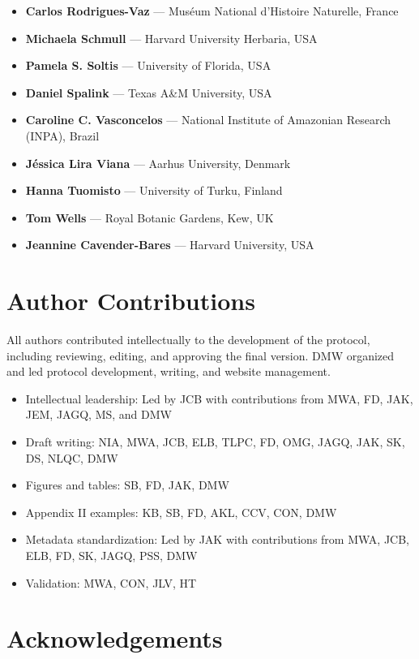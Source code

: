 \documentclass[
  letterpaper,
  DIV=11,
  numbers=noendperiod]{scrreprt}
\providecommand{\tightlist}{%
  \setlength{\itemsep}{0pt}\setlength{\parskip}{0pt}}
\begin{document}
\begin{itemize}
  \textbf{Natalia L. Quinteros} Casaverde --- NASA Goddard Space Flight
  Center, USA
\item
  \textbf{Carlos Rodrigues-Vaz} --- Muséum National d'Histoire
  Naturelle, France
\item
  \textbf{Michaela Schmull} --- Harvard University Herbaria, USA
\item
  \textbf{Pamela S. Soltis} --- University of Florida, USA
\item
  \textbf{Daniel Spalink} --- Texas A\&M University, USA
\item
  \textbf{Caroline C. Vasconcelos} --- National Institute of Amazonian
  Research (INPA), Brazil
\item
  \textbf{Jéssica Lira Viana} --- Aarhus University, Denmark
\item
  \textbf{Hanna Tuomisto} --- University of Turku, Finland
\item
  \textbf{Tom Wells} --- Royal Botanic Gardens, Kew, UK
\item
  \textbf{Jeannine Cavender-Bares} --- Harvard University, USA
\end{itemize}

\section{Author Contributions}\label{author-contributions}

All authors contributed intellectually to the development of the
protocol, including reviewing, editing, and approving the final version.
DMW organized and led protocol development, writing, and website
management.

\begin{itemize}
\tightlist
\item
  Intellectual leadership: Led by JCB with contributions from MWA, FD,
  JAK, JEM, JAGQ, MS, and DMW
\item
  Draft writing: NIA, MWA, JCB, ELB, TLPC, FD, OMG, JAGQ, JAK, SK, DS,
  NLQC, DMW
\item
  Figures and tables: SB, FD, JAK, DMW
\item
  Appendix II examples: KB, SB, FD, AKL, CCV, CON, DMW
\item
  Metadata standardization: Led by JAK with contributions from MWA, JCB,
  ELB, FD, SK, JAGQ, PSS, DMW
\item
  Validation: MWA, CON, JLV, HT
\end{itemize}

\section{Acknowledgements}\label{acknowledgements}
\end{document}
